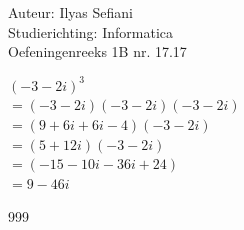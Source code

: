\documentclass[a4paper]{article}
\begin{document}
\noindent \large Auteur: Ilyas Sefiani \\
\noindent \large Studierichting: Informatica\\
\noindent \large Oefeningenreeks 1B nr. 17.17\\

\medskip

\normalsize

$(-3-2i)^{3}$\\

$ = (-3-2i)(-3-2i)(-3-2i)$\\

$ = (9+6i+6i-4)(-3-2i)$\\
                                                     
$ = (5+12i)(-3-2i)$\\

$ = (-15-10i-36i+24)$\\
 
$ = 9-46i$\\


\begin{thebibliography}{999}
\end{thebibliography}
\end{document}
